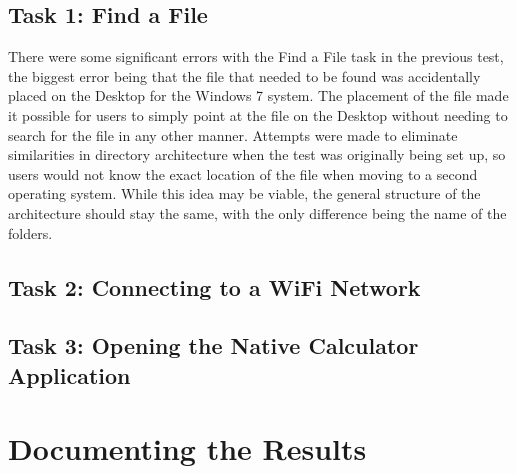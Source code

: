 \documentclass[11pt,letterpaper]{report}
\begin{document}
\subsection{Task 1: Find a File}
There were some significant errors with the Find a File task in the previous test, the biggest error being that the file that needed to be found was accidentally placed on the Desktop for the Windows 7 system. The placement of the file made it possible for users to simply point at the file on the Desktop without needing to search for the file in any other manner. Attempts were made to eliminate similarities in directory architecture when the test was originally being set up, so users would not know the exact location of the file when moving to a second operating system. While this idea may be viable, the general structure of the architecture should stay the same, with the only difference being the name of the folders. 

\subsection{Task 2: Connecting to a WiFi Network}

\subsection{Task 3: Opening the Native Calculator Application}

\section{Documenting the Results}
\end{document}
